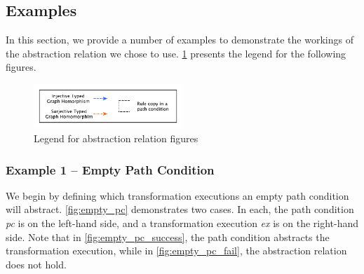 \subsection{Examples}

In this section, we provide a number of examples to demonstrate the workings of
the abstraction relation we chose to use. \cref{fig:legend} presents the legend
for the following figures.

\begin{figure}[htb]
 \centering
                \includegraphics[width=0.5\textwidth]{./figures/abstraction_relation/legend.pdf}
                \caption{Legend for abstraction relation figures}
                \label{fig:legend}
\end{figure}
                
\subsubsection{Example 1 -- Empty Path Condition}

We begin by defining which transformation executions an empty path condition
will abstract. \cref{fig:empty_pc} demonstrates two cases. In each, the path
condition \textit{pc} is on the left-hand side, and a transformation execution \textit{ex} is on the
right-hand side. Note that in \cref{fig:empty_pc_success}, the path condition
abstracts the transformation execution, while in \cref{fig:empty_pc_fail}, the
abstraction relation does not hold.

